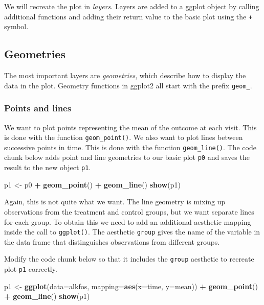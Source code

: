 \documentclass[
]{book}
\newenvironment{Shaded}{\begin{snugshade}}{\end{snugshade}}
\newcommand{\AttributeTok}[1]{\textcolor[rgb]{0.13,0.29,0.53}{#1}}
\newcommand{\FunctionTok}[1]{\textcolor[rgb]{0.13,0.29,0.53}{\textbf{#1}}}
\newcommand{\NormalTok}[1]{#1}
\newcommand{\OtherTok}[1]{\textcolor[rgb]{0.56,0.35,0.01}{#1}}
\newcommand{\SpecialCharTok}[1]{\textcolor[rgb]{0.81,0.36,0.00}{\textbf{#1}}}
\begin{document}
We will recreate the plot in \emph{layers}. Layers are added to a ggplot object by calling additional functions and adding their return value to the basic plot using the \texttt{+} symbol.

\subsection{Geometries}\label{geometries}

The most important layers are \emph{geometries}, which describe how to display the data in the plot. Geometry functions in ggplot2 all start with the prefix \texttt{geom\_}.

\subsubsection{Points and lines}\label{points-and-lines}

We want to plot points representing the mean of the outcome at each visit. This is done with the function \texttt{geom\_point()}. We also want to plot lines between successive points in time. This is done with the function \texttt{geom\_line()}. The code chunk below adds point and line geometries to our basic plot \texttt{p0} and saves the result to the new object \texttt{p1}.

\begin{Shaded}
\begin{Highlighting}[]
\NormalTok{p1 }\OtherTok{\textless{}{-}}\NormalTok{ p0 }\SpecialCharTok{+} \FunctionTok{geom\_point}\NormalTok{() }\SpecialCharTok{+} \FunctionTok{geom\_line}\NormalTok{()}
\FunctionTok{show}\NormalTok{(p1)}
\end{Highlighting}
\end{Shaded}

Again, this is not quite what we want. The line geometry is mixing up observations from the treatment and control groups, but we want separate lines for each group. To obtain this we need to add an additional aesthetic mapping inside the call to \texttt{ggplot()}. The aesthetic \texttt{group} gives the name of the variable in the data frame that distinguishes observations from different groups.

Modify the code chunk below so that it includes the \texttt{group} aesthetic to recreate plot \texttt{p1} correctly.

\begin{Shaded}
\begin{Highlighting}[]
\NormalTok{p1 }\OtherTok{\textless{}{-}} \FunctionTok{ggplot}\NormalTok{(}\AttributeTok{data=}\NormalTok{alkfos, }\AttributeTok{mapping=}\FunctionTok{aes}\NormalTok{(}\AttributeTok{x=}\NormalTok{time, }\AttributeTok{y=}\NormalTok{mean)) }\SpecialCharTok{+}
  \FunctionTok{geom\_point}\NormalTok{() }\SpecialCharTok{+} \FunctionTok{geom\_line}\NormalTok{()}
\FunctionTok{show}\NormalTok{(p1)}
\end{Highlighting}
\end{Shaded}
\end{document}
